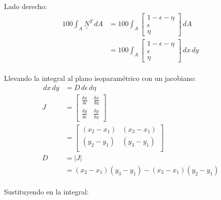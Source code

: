 \documentclass[10pt]{article}
\def\doubleunderline#1{\underline{\underline{#1}}}
\begin{document}
Lado derecho: \\
\begin{align*}
100 \int_A \doubleunderline{N}^T \,d A &= 100 \int_A \begin{bmatrix} 1-\epsilon-\eta \\ \epsilon \\ \eta \end{bmatrix} \,d A \\
&= 100 \int_A \begin{bmatrix} 1-\epsilon-\eta \\ \epsilon \\ \eta \end{bmatrix} \,d x \,d y
\end{align*} \\
Llevando la integral al plano isoparam\'etrico con un jacobiano: \\
\begin{align*}
\,d x \,d y &= D \,d \epsilon \,d \eta \\
J &= \begin{bmatrix}
\frac{\delta x}{ \delta \epsilon} & \frac{\delta x}{\delta \eta} \\
\frac{\delta y}{ \delta \epsilon} & \frac{\delta y}{\delta \eta} 
\end{bmatrix} \\
&= \begin{bmatrix}
(x_2 - x_1) & (x_3 - x_1) \\
(y_2 - y_1) & (y_3 - y_1) \\
\end{bmatrix} \\
D &= |J| \\
&= (x_2 - x_1)(y_3 - y_1) - (x_3 - x_1)(y_2 - y_1)
\end{align*}\\
Sustituyendo en la integral:\\
\end{document}
